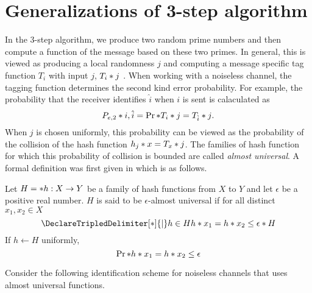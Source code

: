 \section{Generalizations of 3-step algorithm}
In the 3-step algorithm, we produce two random prime numbers and then compute a function of the message based on these two primes. In general, this is viewed as producing a local randomness \(j\) and computing a message specific tag function \(T_i\) with input \(j\), \(\func{T_i}{j}\) \cite{derebeyoglu}. When working with a noiseless channel, the tagging function determines the second kind error probability. For example, the probability that the receiver identifies \(\hat{i}\) when \(i\) is sent is calaculated as 
\begin{equation}
    \func{P_{e,2}}{i,\hat{i}} = \prob{\func{T_i}{j} = \func{T_{\hat{i}}}{j}}.
\end{equation} 
When \(j\) is chosen uniformly, this probability can be viewed as the probability of the collision of the hash function \(\func{h_j}{x} = \func{T_x}{j}\). The families of hash function for which this probability of collision is bounded are called \textit{almost universal}. A formal definition was first given in \cite{carter} which is as follows.
\begin{definition}
    Let \(H = \set{h : X \to Y}\) be a family of hash functions from \(X\) to \(Y\) and let \(\epsilon\) be a positive real number. \(H\) is said to be \(\epsilon\)-almost universal if for all distinct \(x_1, x_2 \in X\) 
    \begin{equation}
        \set<h \in H>{\func{h}{x_1} = \func{h}{x_2}} \leq \epsilon \abs{H}
    \end{equation}
    If \(h \gets H\) uniformly, 
    \begin{equation}
        \prob{\func{h}{x_1} = \func{h}{x_2}} \leq \epsilon
    \end{equation}
\end{definition}

Consider the following identification scheme for noiseless channels that uses almost universal functions.

